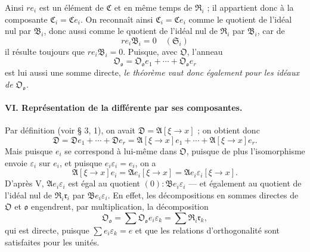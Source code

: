 Ainsi $r e_i$ est un élément de $\mathfrak C$ et en même temps de $\mathfrak R_i$ ; il appartient donc à la composante $\mathfrak C_i=\mathfrak C e_i$. On reconnaît ainsi $\mathfrak C_i=\mathfrak C e_i$ comme le quotient de l'idéal nul par $\mathfrak B_i$, donc aussi comme le quotient de l'idéal nul de $\mathfrak R_i$ par $\mathfrak B_i$, car de
\[
r e_i\mathfrak B_i=0\quad(\mathfrak S_i)
\]
il résulte toujours que $r e_i\mathfrak B_i=0$. Puisque, avec $\mathfrak O$, l'anneau
\[
\mathfrak O_{\mathfrak o}=\mathfrak O_{\mathfrak o}e_1+\cdots+\mathfrak O_{\mathfrak o}e_r
\]
est lui aussi une somme directe, \emph{le théorème vaut donc également pour les idéaux de $\mathfrak O_{\mathfrak o}$.}

\paragraph{VI. Représentation de la différente par ses composantes.}
Par définition (voir \S{} 3, 1), on avait $\mathfrak D=\mathfrak A[\xi\to x]$ ; on obtient donc
\[
\mathfrak D=\mathfrak D e_1+\cdots+\mathfrak D e_r
=\mathfrak A[\xi\to x]e_1+\cdots+\mathfrak A[\xi\to x]e_r.
\]
Mais puisque $e_i$ se correspond à lui-même dans $\mathfrak O$, puisque de plus l'isomorphisme envoie $\varepsilon_i$ sur $e_i$, et puisque $e_i\varepsilon_i=e_i$, on a
\[
\mathfrak A[\xi\to x]e_i=\mathfrak A e_i[\xi\to x]
=\mathfrak A e_i\varepsilon_i[\xi\to x].
\]
D'après V, $\mathfrak A e_i\varepsilon_i$ est égal au quotient $(0):\mathfrak B e_i\varepsilon_i$ --- et également au quotient de l'idéal nul de $\mathfrak R_i\mathfrak r_i$ par $\mathfrak B e_i\varepsilon_i$. En effet, les décompositions en sommes directes de $\mathfrak O$ et $\mathfrak o$ engendrent, par multiplication, la décomposition
\[
\mathfrak O_{\mathfrak o}=\sum\mathfrak O_{\mathfrak o}e_i\varepsilon_k
=\sum\mathfrak R_i\mathfrak r_k,
\]
qui est directe, puisque $\sum e_i\varepsilon_k=e$ et que les relations d'orthogonalité sont satisfaites pour les unités.

